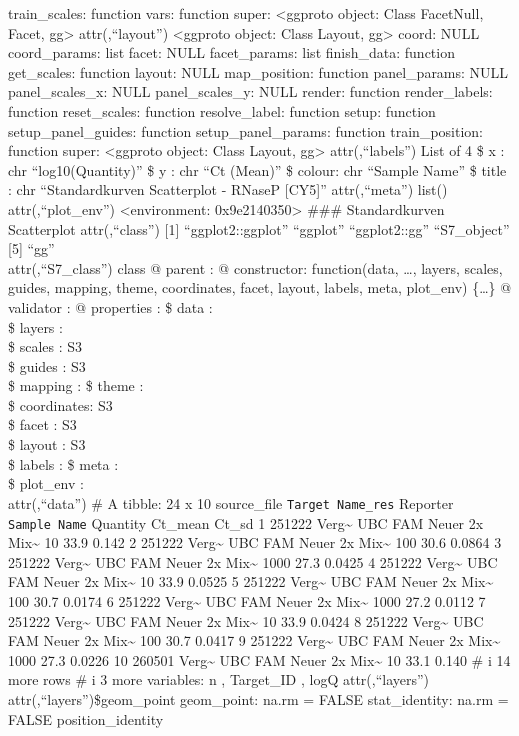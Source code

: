 \documentclass[
]{article}
\begin{document}
train\_scales: function vars: function super: \textless ggproto object:
Class FacetNull, Facet, gg\textgreater{} attr(,``layout'')
\textless ggproto object: Class Layout, gg\textgreater{} coord: NULL
coord\_params: list facet: NULL facet\_params: list finish\_data:
function get\_scales: function layout: NULL map\_position: function
panel\_params: NULL panel\_scales\_x: NULL panel\_scales\_y: NULL
render: function render\_labels: function reset\_scales: function
resolve\_label: function setup: function setup\_panel\_guides: function
setup\_panel\_params: function train\_position: function super:
\textless ggproto object: Class Layout, gg\textgreater{}
attr(,``labels'') List of 4 \$ x : chr ``log10(Quantity)'' \$ y : chr
``Ct (Mean)'' \$ colour: chr ``Sample Name'' \$ title : chr
``Standardkurven Scatterplot - RNaseP {[}CY5{]}'' attr(,``meta'') list()
attr(,``plot\_env'') \textless environment: 0x9e2140350\textgreater{}
\n\#\#\# Standardkurven Scatterplot \n\n attr(,``class'') {[}1{]}
``ggplot2::ggplot'' ``ggplot'' ``ggplot2::gg'' ``S7\_object''\\
{[}5{]} ``gg''\\
attr(,``S7\_class'') class @ parent : @ constructor: function(data,
\ldots, layers, scales, guides, mapping, theme, coordinates, facet,
layout, labels, meta, plot\_env) \{\ldots\} @ validator : @ properties :
\$ data : \\
\$ layers : \\
\$ scales : S3\\
\$ guides : S3\\
\$ mapping : \$ theme : \\
\$ coordinates: S3\\
\$ facet : S3\\
\$ layout : S3\\
\$ labels : \$ meta : \\
\$ plot\_env : \\
attr(,``data'') \# A tibble: 24 x 10 source\_file
\texttt{Target\ Name\_res} Reporter \texttt{Sample\ Name} Quantity
Ct\_mean Ct\_sd 1 251222 Verg\textasciitilde{} UBC FAM Neuer 2x
Mix\textasciitilde{} 10 33.9 0.142 2 251222 Verg\textasciitilde{} UBC
FAM Neuer 2x Mix\textasciitilde{} 100 30.6 0.0864 3 251222
Verg\textasciitilde{} UBC FAM Neuer 2x Mix\textasciitilde{} 1000 27.3
0.0425 4 251222 Verg\textasciitilde{} UBC FAM Neuer 2x
Mix\textasciitilde{} 10 33.9 0.0525 5 251222 Verg\textasciitilde{} UBC
FAM Neuer 2x Mix\textasciitilde{} 100 30.7 0.0174 6 251222
Verg\textasciitilde{} UBC FAM Neuer 2x Mix\textasciitilde{} 1000 27.2
0.0112 7 251222 Verg\textasciitilde{} UBC FAM Neuer 2x
Mix\textasciitilde{} 10 33.9 0.0424 8 251222 Verg\textasciitilde{} UBC
FAM Neuer 2x Mix\textasciitilde{} 100 30.7 0.0417 9 251222
Verg\textasciitilde{} UBC FAM Neuer 2x Mix\textasciitilde{} 1000 27.3
0.0226 10 260501 Verg\textasciitilde{} UBC FAM Neuer 2x
Mix\textasciitilde{} 10 33.1 0.140 \# i 14 more rows \# i 3 more
variables: n , Target\_ID , logQ attr(,``layers'')
attr(,``layers'')\$geom\_point geom\_point: na.rm = FALSE
stat\_identity: na.rm = FALSE position\_identity
\end{document}
